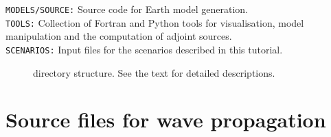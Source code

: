 \texttt{MODELS/SOURCE:} Source code for Earth model generation. \\[5pt]
\texttt{TOOLS:} Collection of Fortran and Python tools for visualisation, model manipulation and the computation of adjoint sources.\\[5pt]
\texttt{SCENARIOS:} Input files for the \SES scenarios described in this tutorial.
\begin{center}
\begin{figure}
\center{}
\caption{\SES directory structure. See the text for detailed descriptions.}\label{F:directory_structure}
\end{figure}
\end{center}


\section{Source files for wave propagation}

